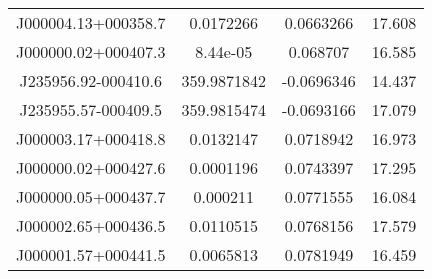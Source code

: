 \begin{table}
\begin{tabular}{cccc}
J000004.13+000358.7 & 0.0172266 & 0.0663266 & 17.608 \\
J000000.02+000407.3 & 8.44e-05 & 0.068707 & 16.585 \\
J235956.92-000410.6 & 359.9871842 & -0.0696346 & 14.437 \\
J235955.57-000409.5 & 359.9815474 & -0.0693166 & 17.079 \\
J000003.17+000418.8 & 0.0132147 & 0.0718942 & 16.973 \\
J000000.02+000427.6 & 0.0001196 & 0.0743397 & 17.295 \\
J000000.05+000437.7 & 0.000211 & 0.0771555 & 16.084 \\
J000002.65+000436.5 & 0.0110515 & 0.0768156 & 17.579 \\
J000001.57+000441.5 & 0.0065813 & 0.0781949 & 16.459 \\
\end{tabular}
\end{table}
